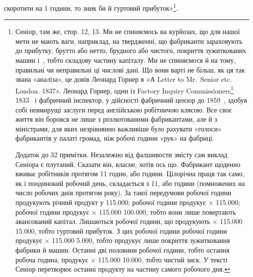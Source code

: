скоротити на 1 години, то зник би й гуртовий прибуток»\footnote{
Сеніор, там же, стор. 12, 13. Ми не спиняємось на курйозах, що для нашої мети не мають ваги,
наприклад, на твердженні, що фабриканти зараховують до прибутку, брутто або нетто, брудного або
чистого, покриття зужиткованих машин і~, тобто складову частину капіталу. Ми не
спиняємося й на тому, правильні чи неправильні ці числові дані. Що вони
варті не більш, як ця так звана «аналіза», це довів Леонард Горнер в «А Letter to Mr.~Senior etc.
London. 1837». Леонард Горнер, один із Factory Inquiry Commissioners\footnote*{
членів комісії для розсліду відносин по фабриках. 
} 1833~ і фабричний
інспектор, у дійсності
фабричний цензор до 1859~, здобув собі невмирущі заслуги перед англійською робітничою клясою. Все
своє життя він боровся не лише з розлютованими фабрикантами, але й з міністрами, для яких
незрівнянно важливіше було рахувати «голоси» фабрикантів у палаті громад, ніж
робочі години «рук» на фабриці.

Додаток до 32 примітки. Незалежно від фалшивости змісту сам виклад Сеніора є плутаний. Сказати він,
власне, хотів ось що. Фабрикант щоденно вживає робітників протягом 11 годин, або  години.
Цілорічна праця так само, як і поодинокий робочий день, складається з 11,
або  години (помножених на число робочих днів протягом року). За такої передумови  робочої
години продукують річний продукт у \num{115.000};  робочої години продукує  ×
\num{115.000};  робочої години продукує  × \num{115.000} \deq{} \num{100.000}, тобто вони лише повертають
авансований капітал. Лишаються  робочої години, що продукують  × \num{115.000} \deq{}
\num{15.000}, тобто гуртовий прибуток. З цих  робочої години  робочої години
продукує  × \num{115.000} \deq{} \num{5.000}, тобто продукує
лише покриття зужитковання фабрики й машин. Останні дві половини робочої години, тобто остання
робоча година, продукує  × \num{115.000} \deq{} \num{10.000}, тобто чистий
зиск.
У тексті Сеніор перетворює останні  продукту на частину самого робочого
дня.
}.

